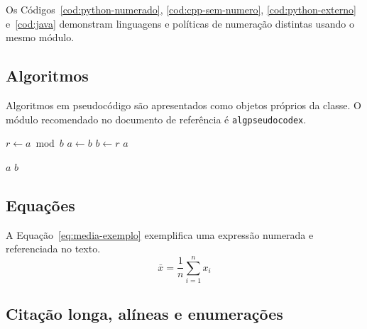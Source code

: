 Os Códigos~\ref{cod:python-numerado}, \ref{cod:cpp-sem-numero}, \ref{cod:python-externo} e~\ref{cod:java} demonstram linguagens e políticas de numeração distintas usando o mesmo módulo.

\subsection{Algoritmos}

Algoritmos em pseudocódigo são apresentados como objetos próprios da classe. O módulo recomendado no documento de referência é \texttt{algpseudocodex}.


\label{alg:mdc-numerado}
\begin{ufcalgorithm}[here][1]
    \State $r \gets a \bmod b$
    \State $a \gets b$
    \State $b \gets r$
  \EndWhile
  \State \Return $a$
\end{ufcalgorithm}

\label{alg:maior-sem-numero}
\begin{ufcalgorithm}[here][0]
    \State \Return $a$
  \Else
    \State \Return $b$
  \EndIf
\end{ufcalgorithm}

\subsection{Equações}

A Equação~\ref{eq:media-exemplo} exemplifica uma expressão numerada e referenciada no texto.
\begin{equation}
  \bar{x} = \frac{1}{n}\sum_{i=1}^{n}x_i
  \label{eq:media-exemplo}
\end{equation}


\subsection{Citação longa, alíneas e enumerações}

